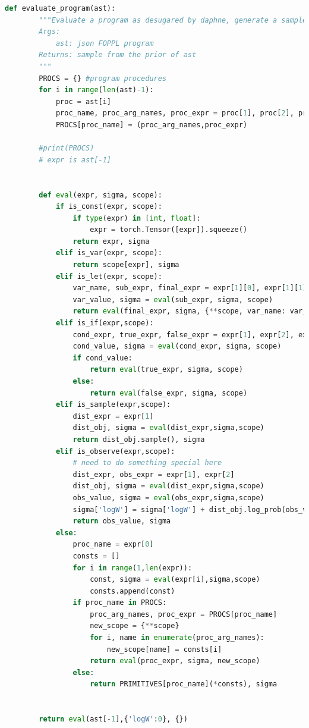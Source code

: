 \documentclass[12pt]{article}%
\theoremstyle{definition}
\begin{document}
	
	\begin{lstlisting}[language=Python ]
	def evaluate_program(ast):
	    """Evaluate a program as desugared by daphne, generate a sample from the prior
	    Args:
	        ast: json FOPPL program
	    Returns: sample from the prior of ast
	    """
	    PROCS = {} #program procedures
	    for i in range(len(ast)-1):
	        proc = ast[i]
	        proc_name, proc_arg_names, proc_expr = proc[1], proc[2], proc[3]
	        PROCS[proc_name] = (proc_arg_names,proc_expr)
	
	    #print(PROCS)
	    # expr is ast[-1]
	
	
	    def eval(expr, sigma, scope):
	        if is_const(expr, scope):
	            if type(expr) in [int, float]:
	                expr = torch.Tensor([expr]).squeeze()
	            return expr, sigma
	        elif is_var(expr, scope):
	            return scope[expr], sigma
	        elif is_let(expr, scope):
	            var_name, sub_expr, final_expr = expr[1][0], expr[1][1], expr[2]
	            var_value, sigma = eval(sub_expr, sigma, scope)
	            return eval(final_expr, sigma, {**scope, var_name: var_value})
	        elif is_if(expr,scope):
	            cond_expr, true_expr, false_expr = expr[1], expr[2], expr[3]
	            cond_value, sigma = eval(cond_expr, sigma, scope)
	            if cond_value:
	                return eval(true_expr, sigma, scope)
	            else:
	                return eval(false_expr, sigma, scope)
	        elif is_sample(expr,scope):
	            dist_expr = expr[1]
	            dist_obj, sigma = eval(dist_expr,sigma,scope)
	            return dist_obj.sample(), sigma
	        elif is_observe(expr,scope):
	            # need to do something special here
	            dist_expr, obs_expr = expr[1], expr[2]
	            dist_obj, sigma = eval(dist_expr,sigma,scope)
	            obs_value, sigma = eval(obs_expr,sigma,scope)
	            sigma['logW'] = sigma['logW'] + dist_obj.log_prob(obs_value)
	            return obs_value, sigma
	        else:
	            proc_name = expr[0]
	            consts = []
	            for i in range(1,len(expr)):
	                const, sigma = eval(expr[i],sigma,scope)
	                consts.append(const)
	            if proc_name in PROCS:
	                proc_arg_names, proc_expr = PROCS[proc_name]
	                new_scope = {**scope}
	                for i, name in enumerate(proc_arg_names):
	                    new_scope[name] = consts[i]
	                return eval(proc_expr, sigma, new_scope)
	            else:
	                return PRIMITIVES[proc_name](*consts), sigma
	
	
	    return eval(ast[-1],{'logW':0}, {})
	\end{lstlisting}
	
\end{document}
